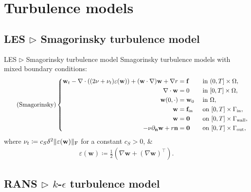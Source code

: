 \documentclass[10pt
hyperref={
    pdfauthor={Hong Quan Ba Nguyen},
    pdftitle={Optimal Shape Design of Air Ducts in Combustion Engines: Design a General Framework},
    pdfsubject={Talk},
    pdfcreator={LaTeX},
}
]{beamer}
\begin{document}
\section{Turbulence models}

\subsection{LES $\triangleright$ Smagorinsky turbulence model}

\begin{frame}{LES $\triangleright$ Smagorinsky turbulence model}
    Smagorinsky turbulence models with mixed boundary conditions:
    \begin{equation}
        \label{Smagorinsky}
        \tag{Smagorinsky}
        \left\{\begin{split}
            \textbf{w}_t - \nabla\cdot\left((2\nu + \nu_t)\varepsilon(\textbf{w})\right) + (\textbf{w}\cdot\nabla)\textbf{w} + \nabla r &= \textbf{f} &&\mbox{ in } (0,T]\times\Omega,\\
            \nabla\cdot\textbf{w} &= 0 &&\mbox{ in } [0,T]\times\Omega,\\
            \textbf{w}(0,\cdot) &= \textbf{w}_0 &&\mbox{ in } \Omega,\\
            \textbf{w} &= \textbf{f}_{\rm in} &&\mbox{ on } [0,T]\times\Gamma_{\rm in},\\
            \textbf{w} &= \textbf{0} &&\mbox{ on } [0,T]\times\Gamma_{\rm wall},\\
            -\nu\partial_{\textbf{n}}\textbf{w} + r\textbf{n} &= \textbf{0} &&\mbox{ on } [0,T]\times\Gamma_{\rm out},
        \end{split}\right.
    \end{equation}
    where $\nu_t\coloneqq c_S\delta^2\|\varepsilon(\textbf{w})\|_{\rm F}$ for a constant $c_S > 0$, {\small\&}
    \begin{align*}
        \varepsilon(\textbf{w})\coloneqq\frac{1}{2}(\nabla\textbf{w} + (\nabla\textbf{w})^\top).
    \end{align*}
\end{frame}

\subsection{RANS $\triangleright$ $k$-$\epsilon$ turbulence model}
\end{document}
